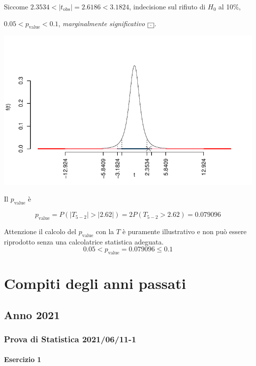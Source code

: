 \documentclass[
  11pt,
]{book}
\theoremstyle{mytheoremstyle}
\theoremstyle{mydefstyle}
\newenvironment{sol}
  {
  \begin{tcolorbox}[enhanced,breakable,arc=0.1mm,boxrule=1pt,colback=white,colframe=iblue,
  title=\bf \fontfamily{lmss}\selectfont \hspace{.5 cm} Soluzione,drop fuzzy shadow]

}{
\end{tcolorbox}
  }
\begin{document}
\begin{sol}
Siccome \(2.3534<|t_\text{obs}|=2.6186<3.1824\), indecisione sul rifiuto di \(H_0\) al 10\%,

\(0.05<p_\text{value}<0.1\), \emph{marginalmente significativo} \(\fbox{.}\).

\begin{center}\includegraphics{Esami_passati_con_soluzioni_files/figure-latex/06-regr-42,-1} \end{center}

Il \(p_{\text{value}}\) è

\[ p_{\text{value}} = P(|T_{5-2}|>|2.62|)=2P(T_{5-2}>2.62)=0.079096 \]

Attenzione il calcolo del \(p_\text{value}\) con la \(T\) è puramente illustrativo e non può essere riprodotto senza una calcolatrice statistica adeguata.\[
 0.05 < p_\text{value}= 0.079096 \leq 0.1 
\]

\end{sol}

\part{Compiti degli anni passati}

\chapter{Anno 2021}\label{anno-2021}

\section{Prova di Statistica 2021/06/11-1}\label{prova-di-statistica-20210611-1}

\subsection{Esercizio 1}\label{esercizio-1-4}
\end{document}
